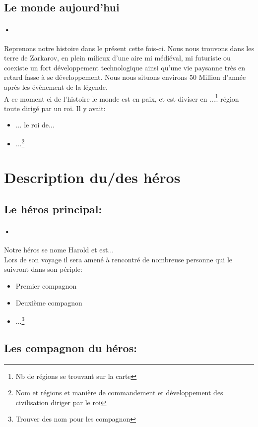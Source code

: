 \subsection{Le monde aujourd'hui}
\paragraph{•}Reprenons notre histoire dans le présent cette fois-ci. Nous nous trouvons dans les terre de Zarkarov, en plein milieux d'une aire mi médiéval, mi futuriste ou coexiste un fort développement technologique ainsi qu'une vie paysanne très en retard fasse à se développement. Nous nous situons environs 50 Million d'année après les évènement de la légende.\\
A ce moment ci de l'histoire le monde est en paix, et est diviser en ...\footnote{Nb de régions se trouvant sur la carte} région toute dirigé par un roi.
Il y avait:
\begin{itemize}
	\item ... le roi de...
	\item ...\footnote{Nom et régions et manière de commandement et développement des civilisation diriger par le roi}
\end{itemize}
\newpage


\section{Description du/des héros}
\subsection{Le héros principal:}
\paragraph{•}Notre héros se nome Harold et est...\\
Lors de son voyage il sera amené à rencontré de nombreuse personne qui le suivront dans son périple:
\begin{itemize}
	\item Premier compagnon
	\item Deuxième compagnon
	\item ...\footnote{Trouver des nom pour les compagnon}
\end{itemize}
\subsection{Les compagnon du héros:}
